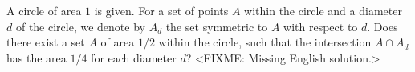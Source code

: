 \problem{}
A circle of area $1$ is given.
For a set of points $A$ within the circle and a diameter $d$ of the circle, we
denote by $A_d$ the set symmetric to $A$ with respect to $d$.
Does there exist a set $A$ of area $1/2$ within the circle, such that the
intersection $A\cap A_d$ has the area $1/4$ for each diameter $d$?
\solution
<FIXME: Missing English solution.>
\endproblem
